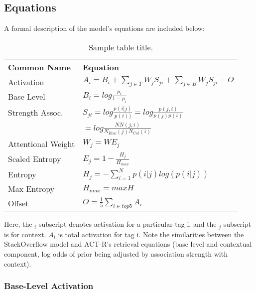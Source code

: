 \documentclass[10pt,letterpaper]{article}
\begin{document}
\subsection{Equations}

A formal description of the model's equations are included below:

\begin{table}[!ht]
  \begin{center} 
    \caption{Sample table title.} 
    \label{sample-table} 
    \vskip 0.12in
    \begin{tabular}{ll} 
      \hline
      Common Name &  Equation \\
      \hline
      Activation & 		$A_{i} = B_{i} + \sum_{j\in T}^{ } W_{j} S_{ji} + \sum_{j\in B}^{ } W_{j} S_{ji} - O$ \\
      Base Level & 		$B_{i} = log \frac{p_{i}}{1-p_{i}}$ \\
      Strength Assoc. &		$S_{ji} = log \frac{p(i|j)}{p(i))} = log \frac{p(j,i)}{p(j)p(i)}$ \\
      & 			$= log \frac{NN(j,i)}{N_{Row}(j)N_{Col}(i)}$ \\
      Attentional Weight	& $W_{j} = WE_{j}$ \\
      Scaled Entropy & 		$E_{j} = 1-\frac{H_{j}}{H_{max}}$ \\
      Entropy & 		$H_{j} = -\sum_{i=1}^{N}p(i|j)log\left (  p(i|j) \right )$ \\
      Max Entropy & 		$H_{max} = maxH$ \\
      Offset & 			$O = \frac{1}{5}\sum_{i\in top 5}^{ } A_{i}$ \\
      \hline
    \end{tabular} 
  \end{center} 
\end{table}

Here, the $_{i}$ subscript denotes activation for a particular tag i, and the $_{j}$ subscript is for context.
$A_{i}$ is total activation for tag i.
Note the similarities between the StackOverflow model and ACT-R's retrieval equations (base level and contextual component, log odds of prior being adjusted by association strength with context).

\subsubsection{Base-Level Activation}
\end{document}
